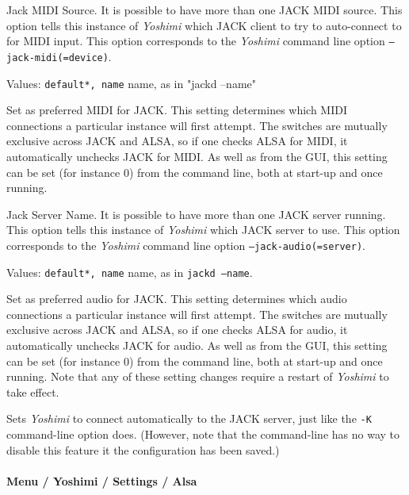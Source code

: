    Jack MIDI Source.
   It is possible to have more than one JACK MIDI source.  This option
   tells this instance of \textsl{Yoshimi} which JACK
   client to try to auto-connect to for MIDI input.
   This option corresponds to the \textsl{Yoshimi} command line option
   \texttt{--jack-midi(=device)}.

   Values: \texttt{default*, name} name, as in "jackd --name"

   Set as preferred MIDI for JACK.
   This setting determines which MIDI connections a particular instance will
   first attempt. The switches are mutually exclusive across JACK and ALSA,
   so if one checks ALSA for MIDI, it automatically unchecks JACK for MIDI.
   As well as from the GUI, this setting can be set (for instance 0) from the
   command line, both at start-up and once running.

   Jack Server Name.
   It is possible to have more than one JACK server running.  This option
   tells this instance of \textsl{Yoshimi} which JACK server to use.
   This option corresponds to the \textsl{Yoshimi} command line option
   \texttt{--jack-audio(=server)}.

   Values: \texttt{default*, name} name, as in
   \texttt{jackd --name}.

   Set as preferred audio for JACK.
   This setting determines which audio connections a particular instance will
   first attempt. The switches are mutually exclusive across JACK and ALSA,
   so if one checks ALSA for audio, it automatically unchecks JACK for audio.
   As well as from the GUI, this setting can be set (for instance 0) from the
   command line, both at start-up and once running.
   Note that any of these setting changes require a restart of \textsl{Yoshimi}
   to take effect.

   Sets \textsl{Yoshimi} to connect automatically to the JACK server, just like
   the \texttt{-K} command-line option does.  (However, note that the
   command-line has no way to disable this feature it the configuration has been
   saved.)

\paragraph{Menu / Yoshimi / Settings / Alsa}
\label{paragraph:menu_yoshimi_settings_alsa_tab}

